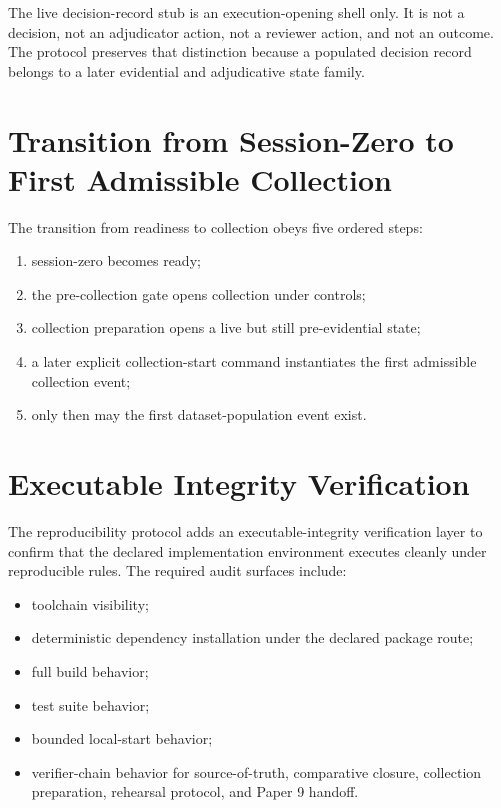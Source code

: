 \documentclass[11pt,a4paper]{article}
\begin{document}
The live decision-record stub is an execution-opening shell only. It is not a
decision, not an adjudicator action, not a reviewer action, and not an
outcome. The protocol preserves that distinction because a populated
decision record belongs to a later evidential and adjudicative state family.

\section{Transition from Session-Zero to First Admissible Collection}

The transition from readiness to collection obeys five ordered steps:

\begin{enumerate}
\item session-zero becomes ready;
\item the pre-collection gate opens collection under controls;
\item collection preparation opens a live but still pre-evidential state;
\item a later explicit collection-start command instantiates the first admissible collection event;
\item only then may the first dataset-population event exist.
\end{enumerate}

\section{Executable Integrity Verification}

The reproducibility protocol adds an executable-integrity verification layer to confirm that the
declared implementation environment executes cleanly under reproducible rules.
The required audit surfaces include:

\begin{itemize}
\item toolchain visibility;
\item deterministic dependency installation under the declared package route;
\item full build behavior;
\item test suite behavior;
\item bounded local-start behavior;
\item verifier-chain behavior for source-of-truth, comparative closure, collection preparation, rehearsal protocol, and Paper 9 handoff.
\end{itemize}
\end{document}
